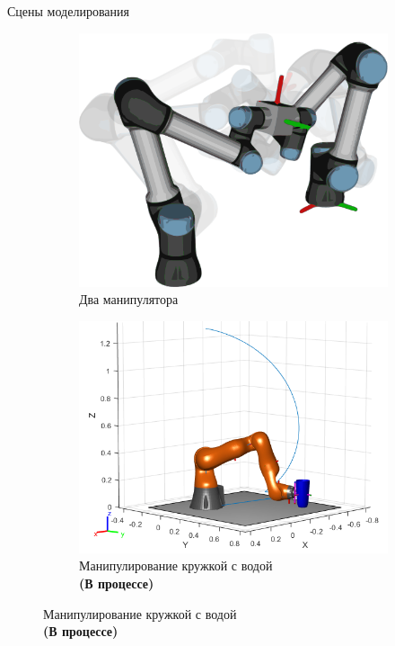 \documentclass[11pt, aspectratio=169]{beamer}
\begin{document}
\begin{frame}{Сцены моделирования}
    \begin{figure}[ht]
        \begin{subfigure}{0.32\textwidth}
            \centering
            \includegraphics[width=1.0\textwidth]{figures/ur_coop.pdf}
            \caption{\centering Два манипулятора}
            \label{fig:ur_coop}
        \end{subfigure}
        \begin{subfigure}{0.32\textwidth}
            \centering
            \includegraphics[width=1.0\textwidth]{figures/cup_constr.png}
            \caption{\centering Манипулирование кружкой с водой\\ \textbf{(В процессе)}}

\end{subfigure}
\end{figure}
\end{frame}
\end{document}
